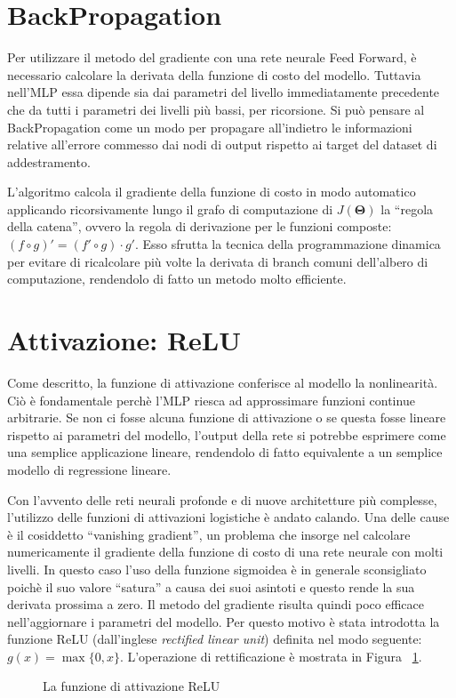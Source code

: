\section{BackPropagation}
Per utilizzare il metodo del gradiente con una rete neurale Feed Forward, è
necessario calcolare la derivata della funzione di costo del modello. Tuttavia
nell'MLP essa dipende sia dai parametri del livello immediatamente precedente
che da tutti i parametri dei livelli più bassi, per ricorsione. Si può pensare
al BackPropagation come un modo per propagare all'indietro le informazioni
relative all'errore commesso dai nodi di output rispetto ai target del dataset
di addestramento.

L'algoritmo calcola il gradiente della funzione di costo in modo automatico
applicando ricorsivamente lungo il grafo di computazione di $J(\bm \Theta)$ la
``regola della catena'', ovvero la regola di derivazione per le funzioni
composte: $ (f \circ g)' = (f' \circ g)\cdot g' $. Esso sfrutta la tecnica
della programmazione dinamica per evitare di ricalcolare più volte la derivata
di branch comuni dell'albero di computazione, rendendolo di fatto un metodo
molto efficiente.
\section{Attivazione: ReLU}
Come descritto, la funzione di attivazione conferisce al modello la
nonlinearità. Ciò è fondamentale perchè l'MLP riesca ad approssimare funzioni
continue arbitrarie. Se non ci fosse alcuna funzione di attivazione o se questa
fosse lineare rispetto ai parametri del modello, l'output della rete si
potrebbe esprimere come una semplice applicazione lineare, rendendolo di fatto
equivalente a un semplice modello di regressione lineare.

Con l'avvento delle reti neurali profonde e di nuove architetture più
complesse, l'utilizzo delle funzioni di attivazioni logistiche è andato
calando. Una delle cause è il cosiddetto ``vanishing gradient'', un problema
che insorge nel calcolare numericamente il gradiente della funzione di costo di
una rete neurale con molti livelli. In questo caso l'uso della funzione
sigmoidea è in generale sconsigliato poichè il suo valore ``satura'' a causa
dei suoi asintoti e questo rende la sua derivata prossima a zero. Il metodo del
gradiente risulta quindi poco efficace nell'aggiornare i parametri del modello.
Per questo motivo è stata introdotta la funzione ReLU (dall'inglese
\emph{rectified linear unit}) definita nel modo seguente: 
$g(x) = \max\{0, x\}$. L'operazione di rettificazione è mostrata in Figura~%
\ref{fig:relu}.
\begin{figure}[H]
  \caption{La funzione di attivazione ReLU}%
  \label{fig:relu}
\end{figure}

